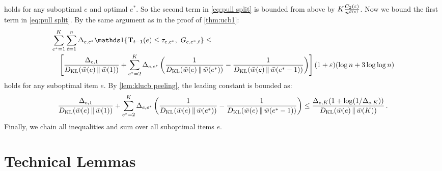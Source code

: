 holds for any suboptimal $e$ and optimal $e^\ast$. So the second term in \eqref{eq:pull split} is bounded from above by $K \frac{C_2(\varepsilon)}{n^{\beta(\varepsilon)}}$. Now we bound the first term in \eqref{eq:pull split}. By the same argument as in the proof of \cref{thm:ucb1}:
\begin{align*}
  & \sum_{e^\ast = 1}^K \sum_{t = 1}^n
  \Delta_{e, e^\ast} \I{\rnd{T}_{t - 1}(e) \leq \tau_{e, e^\ast}, \ G_{e, e^\ast, t}} \leq \\
  & \quad \left[\frac{\Delta_{e, 1}}{\kl{\bar{w}(e)}{\bar{w}(1)}} + \sum_{e^\ast = 2}^K \Delta_{e, e^\ast}
  \left(\frac{1}{\kl{\bar{w}(e)}{\bar{w}(e^\ast)}} - \frac{1}{\kl{\bar{w}(e)}{\bar{w}(e^\ast - 1)}}\right)\right]
  (1 + \eps) (\log n + 3 \log \log n)
\end{align*}
holds for any suboptimal item $e$. By \cref{lem:klucb peeling}, the leading constant is bounded as:
\begin{align*}
  \frac{\Delta_{e, 1}}{D_\mathrm{KL}(\bar{w}(e) \,\|\, \bar{w}(1))} + \sum_{e^\ast = 2}^K \Delta_{e, e^\ast}
  \left(\frac{1}{D_\mathrm{KL}(\bar{w}(e) \,\|\, \bar{w}(e^\ast))} - \frac{1}{D_\mathrm{KL}(\bar{w}(e) \,\|\, \bar{w}(e^\ast - 1))}\right) \leq
  \frac{\Delta_{e, K} (1 + \log(1 / \Delta_{e, K}))}{D_\mathrm{KL}(\bar{w}(e) \,\|\, \bar{w}(K))}\,.
\end{align*}
Finally, we chain all inequalities and sum over all suboptimal items $e$.


\section{Technical Lemmas}
\label{sec:lemmas}

